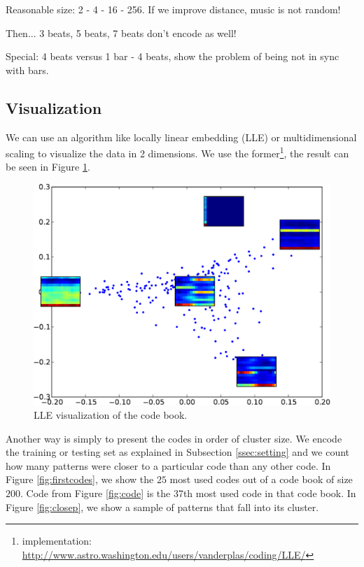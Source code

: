 \documentclass{article}
\begin{document}
Reasonable size: 2 - 4 - 16 - 256. If we improve distance, music
is not random!

Then... 3 beats, 5 beats, 7 beats don't encode as well!

Special: 4 beats versus 1 bar - 4 beats, show the problem of being
not in sync with bars.


\subsection{Visualization}
We can use an algorithm like locally linear embedding \cite{Roweis2000} (LLE) 
or multidimensional scaling \cite{Kruskal1964} to visualize the data in
2 dimensions. We use the former\footnote{implementation: 
\url{http://www.astro.washington.edu/users/vanderplas/coding/LLE/}}, the
result can be seen in Figure \ref{fig:lle}.


\begin{figure}[htb]
\begin{center}
\includegraphics[width=.9\columnwidth]{codes_lle}
\end{center}
\caption{{LLE visualization of the code book.}}
\label{fig:lle}
\end{figure}

Another way is simply to present the codes in order of cluster size.
We encode the training or testing set as explained in Subsection 
\ref{ssec:setting} and we count how many patterns were closer to a particular
code than any other code. In Figure \ref{fig:firstcodes}, we show the $25$
most used codes out of a code book of size $200$.
Code from Figure \ref{fig:code} is the 37th most used code in that
code book. In Figure \ref{fig:closep}, we show a sample of patterns that
fall into its cluster.
\end{document}
